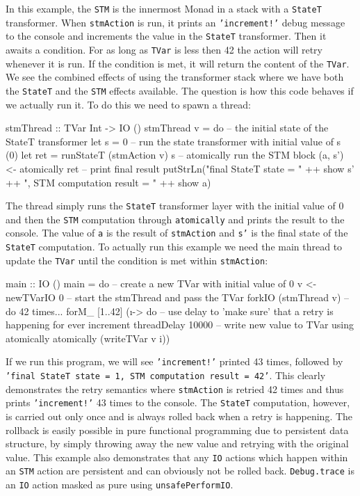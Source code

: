 In this example, the \texttt{STM} is the innermost Monad in a stack with a \texttt{StateT} transformer. When \texttt{stmAction} is run, it prints an \texttt{'increment!'} debug message to the console and increments the value in the \texttt{StateT} transformer. Then it awaits a condition. For as long as \texttt{TVar} is less then 42 the action will retry whenever it is run. If the condition is met, it will return the content of the \texttt{TVar}. We see the combined effects of using the transformer stack where we have both the \texttt{StateT} and the \texttt{STM} effects available. The question is how this code behaves if we actually run it. To do this we need to spawn a thread:

\begin{HaskellCode}
stmThread :: TVar Int -> IO ()
stmThread v = do
  -- the initial state of the StateT transformer
  let s = 0
  -- run the state transformer with initial value of s (0)
  let ret = runStateT (stmAction v) s
  -- atomically run the STM block
  (a, s') <- atomically ret
  -- print final result
  putStrLn("final StateT state     = " ++ show s' ++
           ", STM computation result = " ++ show a)
\end{HaskellCode}

The thread simply runs the \texttt{StateT} transformer layer with the initial value of 0 and then the \texttt{STM} computation through \texttt{atomically} and prints the result to the console. The value of \texttt{a} is the result of \texttt{stmAction} and \texttt{s'} is the final state of the \texttt{StateT} computation. To actually run this example we need the main thread to update the \texttt{TVar} until the condition is met within \texttt{stmAction}:

\begin{HaskellCode}
main :: IO ()
main = do
  -- create a new TVar with initial value of 0
  v <- newTVarIO 0 
  -- start the stmThread and pass the TVar
  forkIO (stmThread v)
  -- do 42 times...
  forM_ [1..42] (\i -> do
    -- use delay to 'make sure' that a retry is happening for ever increment
    threadDelay 10000
    -- write new value to TVar using atomically
    atomically (writeTVar v i))
\end{HaskellCode}

If we run this program, we will see \texttt{'increment!'} printed 43 times, followed by \texttt{'final StateT state = 1, STM computation result = 42'}. This clearly demonstrates the retry semantics where \texttt{stmAction} is retried 42 times and thus prints \texttt{'increment!'} 43 times to the console. The \texttt{StateT} computation, however, is carried out only once and is always rolled back when a retry is happening. The rollback is easily possible in pure functional programming due to persistent data structure, by simply throwing away the new value and retrying with the original value. This example also demonstrates that any \texttt{IO} actions which happen within an \texttt{STM} action are persistent and can obviously not be rolled back. \texttt{Debug.trace} is an \texttt{IO} action masked as pure using \texttt{unsafePerformIO}.